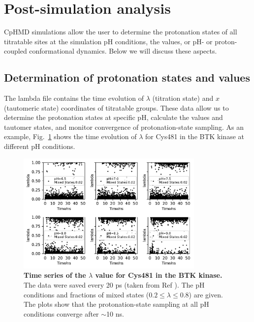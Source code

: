 \section{Post-simulation analysis}
CpHMD simulations allow the user to determine
the protonation states of all titratable sites
at the simulation pH conditions, 
the {\pka} values, 
or pH- or proton-coupled conformational dynamics. 
Below we will discuss these aspects. 


\subsection{Determination of protonation states and {\pka} values}
The lambda file contains the time evolution of $\lambda$ (titration state) and $x$ (tautomeric state) coordinates of titratable groups.
These data allow us to determine the protonation
states at specific pH, calculate the
{\pka} values and tautomer states, and 
monitor convergence of protonation-state sampling.
As an example, Fig.~\ref{Fig:lambda_time} shows the time evolution of $\lambda$ for Cys481 in the BTK kinase
at different pH conditions.

\begin{figure}[htb!]
    \centering
    \includegraphics[width=3.6in]{figs/btk_c481_lambdavstime.pdf}
    \caption{\textbf{Time series of the $\lambda$ value for Cys481 in the BTK kinase.} The data were saved every 20 ps (taken from Ref \cite{Liu_Shen_2021_J.Med.Chem.}). The pH conditions and fractions of mixed states ($0.2 \le \lambda \le 0.8$) are given. The plots show that the protonation-state sampling at all pH conditions converge after $\sim$10 ns.
    }
\label{Fig:lambda_time}
\end{figure}
 
